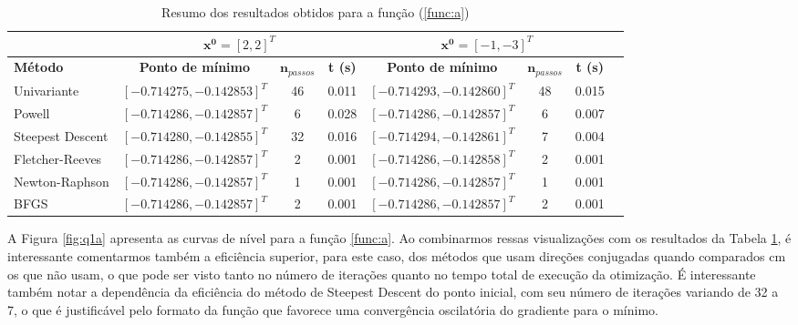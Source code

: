\documentclass[10pt, a4paper]{article}
\begin{document}
\begin{table}[htpb]
  \centering
  \begin{tabular}{|l|c|c|c|c|c|c|c|}
    \multicolumn{1}{c}{} %
    & 
    \multicolumn{3}{c}{$\mathbf{x^0} = [2, 2]^T$} \vline
    & 
    \multicolumn{3}{c}{$\mathbf{x^0} = [-1, -3]^T$} \\%
    \hline%
    \textbf{Método}
    &
    \textbf{Ponto de mínimo}
    & 
    $\mathbf{n}_{passos}$
    & 
    \textbf{t (s)}
    &
    \textbf{Ponto de mínimo}
    & 
    $\mathbf{n}_{passos}$
    & 
    \textbf{t (s)}
    \\
    Univariante        & $[-0.714275, -0.142853]^T$ & 46  & 0.011 &  $[-0.714293, -0.142860]^T$ &  48 &  0.015      \\
    Powell             & $[-0.714286, -0.142857]^T$ & 6   & 0.028 &  $[-0.714286, -0.142857]^T$ &  6  &  0.007      \\
    Steepest Descent   & $[-0.714280, -0.142855]^T$ & 32  & 0.016 &  $[-0.714294, -0.142861]^T$ &  7  &  0.004      \\
    Fletcher-Reeves    & $[-0.714286, -0.142857]^T$ & 2   & 0.001 &  $[-0.714286, -0.142858]^T$ &  2  &  0.001      \\
    Newton-Raphson     & $[-0.714286, -0.142857]^T$ & 1   & 0.001 &  $[-0.714286, -0.142857]^T$ &  1  &  0.001      \\
    BFGS               & $[-0.714286, -0.142857]^T$ & 2   & 0.001 &  $[-0.714286, -0.142857]^T$ &  2  &  0.001      \\
    \hline
  \end{tabular}
  \caption{Resumo dos resultados obtidos para a função (\ref{func:a})}
  \label{tab:q1a_results}
\end{table}

A Figura \ref{fig:q1a} apresenta as curvas de nível para a função \ref{func:a}. Ao combinarmos ressas visualizações com os resultados da Tabela \ref{tab:q1a_results},
é interessante comentarmos também a eficiência superior, para este caso, dos métodos que usam direções conjugadas quando comparados cm os que não usam,
o que pode ser visto tanto no número de iterações quanto no tempo total de execução da otimização. É interessante também notar a dependência da eficiência do método de
Steepest Descent do ponto inicial, com seu número de iterações variando de 32 a 7, o que é justificável pelo formato da função que favorece uma convergência oscilatória
do gradiente para o mínimo.
\end{document}
